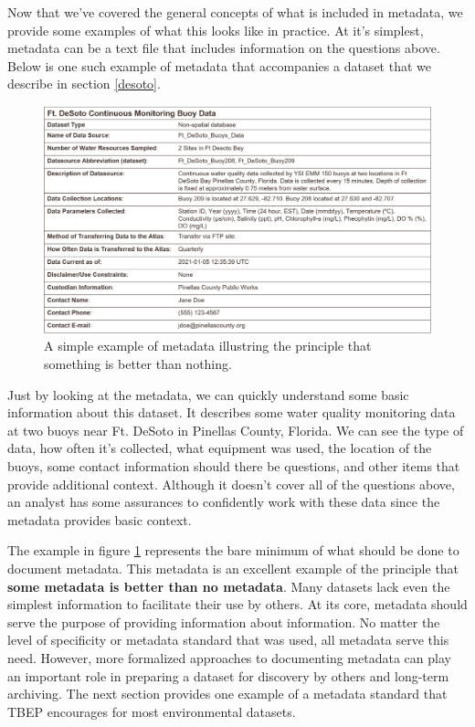 \documentclass[
]{book}
\begin{document}
Now that we've covered the general concepts of what is included in metadata, we provide some examples of what this looks like in practice. At it's simplest, metadata can be a text file that includes information on the questions above. Below is one such example of metadata that accompanies a dataset that we describe in section \ref{desoto}.

\begin{figure}

{\centering \includegraphics[width=1\linewidth]{img/desotometa} 

}

\caption{A simple example of metadata illustring the principle that something is better than nothing.}\label{fig:desotometa}
\end{figure}

Just by looking at the metadata, we can quickly understand some basic information about this dataset. It describes some water quality monitoring data at two buoys near Ft. DeSoto in Pinellas County, Florida. We can see the type of data, how often it's collected, what equipment was used, the location of the buoys, some contact information should there be questions, and other items that provide additional context. Although it doesn't cover all of the questions above, an analyst has some assurances to confidently work with these data since the metadata provides basic context.

The example in figure \ref{fig:desotometa} represents the bare minimum of what should be done to document metadata. This metadata is an excellent example of the principle that \textbf{some metadata is better than no metadata}. Many datasets lack even the simplest information to facilitate their use by others. At its core, metadata should serve the purpose of providing information about information. No matter the level of specificity or metadata standard that was used, all metadata serve this need. However, more formalized approaches to documenting metadata can play an important role in preparing a dataset for discovery by others and long-term archiving. The next section provides one example of a metadata standard that TBEP encourages for most environmental datasets.
\end{document}
